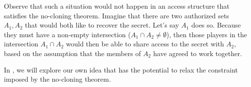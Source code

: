 Observe that such a situation would not happen in an access structure that satisfies the no-cloning theorem. Imagine that there are two authorized sets $A_1,A_2$ that would both like to recover the secret. Let's say $A_1$ does so. Because they must have a non-empty intersection ($A_1 \cap A_2 \neq \emptyset$), then those players in the intersection $A_1 \cap A_2$ would then be able to share access to the secret with $A_2$, based on the assumption that the members of $A_2$ have agreed to work together.

In , we will explore our own idea that has the potential to relax the constraint imposed by the no-cloning theorem.
